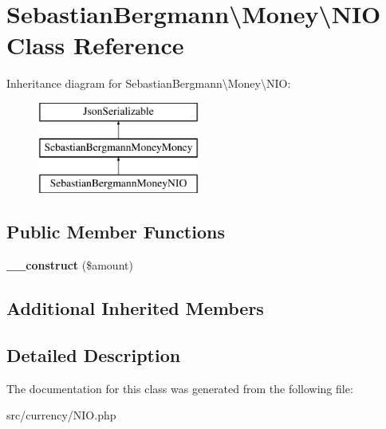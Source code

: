 \hypertarget{classSebastianBergmann_1_1Money_1_1NIO}{}\section{Sebastian\+Bergmann\textbackslash{}Money\textbackslash{}N\+I\+O Class Reference}
\label{classSebastianBergmann_1_1Money_1_1NIO}
Inheritance diagram for Sebastian\+Bergmann\textbackslash{}Money\textbackslash{}N\+I\+O\+:\begin{figure}[H]
\begin{center}
\leavevmode
\includegraphics[height=3.000000cm]{classSebastianBergmann_1_1Money_1_1NIO}
\end{center}
\end{figure}
\subsection*{Public Member Functions}
\begin{DoxyCompactItemize}
\item 
\hypertarget{classSebastianBergmann_1_1Money_1_1NIO_a35bc801e686705023d2a5839b7e08867}{}{\bfseries \+\_\+\+\_\+construct} (\$amount)\label{classSebastianBergmann_1_1Money_1_1NIO_a35bc801e686705023d2a5839b7e08867}

\end{DoxyCompactItemize}
\subsection*{Additional Inherited Members}


\subsection{Detailed Description}


The documentation for this class was generated from the following file\+:\begin{DoxyCompactItemize}
\item 
src/currency/N\+I\+O.\+php\end{DoxyCompactItemize}
